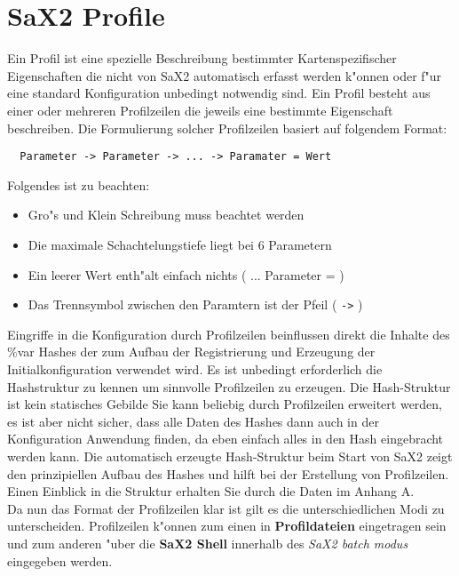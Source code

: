 \chapter{SaX2 Profile}
\label{cha:pro}
\minitoc
Ein Profil ist eine spezielle Beschreibung bestimmter
Kartenspezifischer Eigenschaften die nicht von SaX2 automatisch
erfasst werden k"onnen oder f"ur eine standard Konfiguration 
unbedingt notwendig sind. Ein Profil besteht aus einer oder mehreren 
Profilzeilen die jeweils eine bestimmte Eigenschaft beschreiben. 
Die Formulierung solcher Profilzeilen basiert auf folgendem Format: 

\begin{verbatim}
  Parameter -> Parameter -> ... -> Paramater = Wert
\end{verbatim}

Folgendes ist zu beachten:
\begin{itemize}
\item Gro"s und Klein Schreibung muss beachtet werden
\item Die maximale Schachtelungstiefe liegt bei 6 Parametern
\item Ein leerer Wert enth"alt einfach nichts ( ... Parameter = )
\item Das Trennsymbol zwischen den Paramtern ist der Pfeil ( \verb+->+ )
\end{itemize}

Eingriffe in die Konfiguration durch Profilzeilen beinflussen 
direkt die Inhalte des \%var Hashes der zum Aufbau der Registrierung 
und Erzeugung der Initialkonfiguration verwendet wird. Es ist 
unbedingt erforderlich die Hashstruktur zu kennen um sinnvolle
Profilzeilen zu erzeugen. Die Hash-Struktur ist kein statisches 
Gebilde Sie kann beliebig durch Profilzeilen erweitert werden, 
es ist aber nicht sicher, dass alle Daten des Hashes dann auch in 
der Konfiguration Anwendung finden, da eben einfach alles in den 
Hash eingebracht werden kann. Die automatisch erzeugte Hash-Struktur
beim Start von SaX2 zeigt den prinzipiellen Aufbau des Hashes 
und hilft bei der Erstellung von Profilzeilen. Einen Einblick 
in die Struktur erhalten Sie durch die Daten im Anhang A.\\ 

Da nun das Format der Profilzeilen klar ist gilt es die 
unterschiedlichen Modi zu unterscheiden. Profilzeilen k"onnen zum 
einen in \textbf{Profildateien} eingetragen sein und zum 
anderen "uber die \textbf{SaX2 Shell} innerhalb des \textit{SaX2 batch modus}
eingegeben werden.


